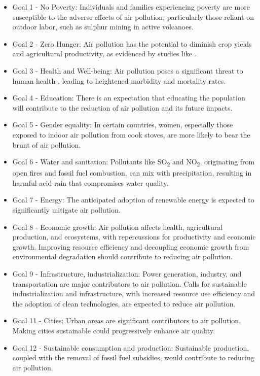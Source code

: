 \begin{itemize}
    \item Goal 1 - No Poverty: Individuals and families experiencing poverty are more susceptible to the adverse effects of air pollution, particularly those reliant on outdoor labor, such as sulphur mining in active volcanoes.
    \item  Goal 2 - Zero Hunger: Air pollution has the potential to diminish crop yields and agricultural productivity, as evidenced by studies like \citep{avnery2011global}.
    \item Goal 3 - Health and Well-being: Air pollution poses a significant threat to human health \citep{who2020world}, leading to heightened morbidity and mortality rates.
    \item Goal 4 - Education: There is an expectation that educating the population will contribute to the reduction of air pollution and its future impacts.
    \item Goal 5 - Gender equality: In certain countries, women, especially those exposed to indoor air pollution from cook stoves, are more likely to bear the brunt of air pollution.
    \item Goal 6 - Water and sanitation: Pollutants like SO\textsubscript{2} and NO\textsubscript{2}, originating from open fires and fossil fuel combustion, can mix with precipitation, resulting in harmful acid rain that compromises water quality.
    \item Goal 7 - Energy: The anticipated adoption of renewable energy is expected to significantly mitigate air pollution.
    \item Goal 8 - Economic growth: Air pollution affects health, agricultural production, and ecosystems, with repercussions for productivity and economic growth. Improving resource efficiency and decoupling economic growth from environmental degradation should contribute to reducing air pollution.
    \item Goal 9 - Infrastructure, industrialization: Power generation, industry, and transportation are major contributors to air pollution. Calls for sustainable industrialization and infrastructure, with increased resource use efficiency and the adoption of clean technologies, are expected to reduce air pollution.
    \item Goal 11 - Cities: Urban areas are significant contributors to air pollution. Making cities sustainable could progressively enhance air quality.
    \item Goal 12 - Sustainable consumption and production: Sustainable production, coupled with the removal of fossil fuel subsidies, would contribute to reducing air pollution.

\end{itemize}
